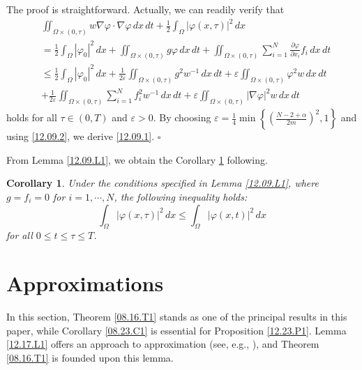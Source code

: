 \documentclass[11pt]{article}
\newtheorem{corollary}{Corollary}[section]
\newenvironment{proof}{{\bf {Proof.}}}{\hfill $\square$}
\numberwithin{equation}{section}
\def\bf{\textbf}
\begin{document}
 \begin{proof}
The proof is straightforward. Actually, we can readily verify that
\begin{equation*}
\begin{split}
&\iint_{\Omega \times (0, \tau)} w \nabla \varphi \cdot \nabla \varphi \, dx \, dt + \frac{1}{2} \int_\Omega |\varphi(x, \tau)|^2 \, dx \\
&= \frac{1}{2} \int_\Omega |\varphi_0|^2 \, dx + \iint_{\Omega \times (0, \tau)} g \varphi \, dx \, dt + \iint_{\Omega \times (0, \tau)} \sum_{i=1}^N \frac{\partial \varphi}{\partial x_i} f_i \, dx \, dt \\
&\leq \frac{1}{2} \int_\Omega |\varphi_0|^2 \, dx + \frac{1}{2\varepsilon} \iint_{\Omega \times (0, \tau)} g^2 w^{-1} \, dx \, dt + \varepsilon \iint_{\Omega \times (0, \tau)} \varphi^2 w \, dx \, dt \\
&  + \frac{1}{2\varepsilon} \iint_{\Omega \times (0, \tau)} \sum_{i=1}^N f_i^2 w^{-1} \, dx \, dt + \varepsilon \iint_{\Omega \times (0, \tau)} |\nabla \varphi|^2 w \, dx \, dt
\end{split}
\end{equation*}
holds for all $\tau \in (0, T)$ and $\varepsilon > 0$.
By choosing $\varepsilon = \frac{1}{4} \min\left\{\left(\frac{N - 2 + \alpha}{2m}\right)^2, 1\right\}$ and using \eqref{12.09.2}, we derive \eqref{12.09.1}.
\end{proof}

From Lemma \ref{12.09.L1}, we obtain the Corollary \ref{12.11.C1} following.
 \begin{corollary}\label{12.11.C1}
Under the conditions specified in Lemma \ref{12.09.L1}, where $g = f_i = 0$ for $i = 1, \cdots, N$, the following inequality holds:
\begin{equation*}
\int_\Omega |\varphi(x, \tau)|^2 \, dx \leq \int_\Omega |\varphi(x, t)|^2 \, dx
\end{equation*}
for all $0 \leq t \leq \tau \leq T$.
\end{corollary}


\section{Approximations}\label{Section 3}

 In this section, Theorem \ref{08.16.T1} stands as one of the principal results in this paper, while Corollary \ref{08.23.C1} is essential for Proposition \ref{12.23.P1}. Lemma \ref{12.17.L1} offers an approach to approximation (see, e.g., \cite{Wu1}), and Theorem \ref{08.16.T1} is founded upon this lemma.
\end{document}

